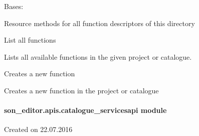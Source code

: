 \documentclass[letterpaper,10pt,english]{sphinxmanual}
\begin{document}

\begin{fulllineitems}
\label{_source/son_editor.apis:son_editor.apis.catalogue_functionsapi.Functions}
Bases: 

Resource methods for all function descriptors of this directory

\begin{fulllineitems}
\label{_source/son_editor.apis:son_editor.apis.catalogue_functionsapi.Functions.get}
List all functions

Lists all available functions in the given project or catalogue.

\end{fulllineitems}


\begin{fulllineitems}
\label{_source/son_editor.apis:son_editor.apis.catalogue_functionsapi.Functions.methods}
\end{fulllineitems}


\begin{fulllineitems}
\label{_source/son_editor.apis:son_editor.apis.catalogue_functionsapi.Functions.post}
Creates a new function

Creates a new function in the project or catalogue

\end{fulllineitems}


\end{fulllineitems}



\paragraph{son\_editor.apis.catalogue\_servicesapi module}
\label{_source/son_editor.apis:module-son_editor.apis.catalogue_servicesapi}\label{_source/son_editor.apis:son-editor-apis-catalogue-servicesapi-module}
Created on 22.07.2016
\end{document}
